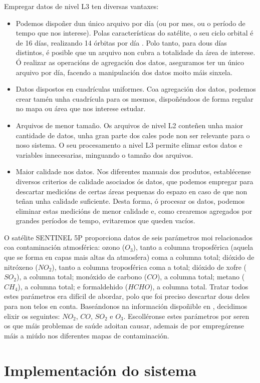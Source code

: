 Empregar datos de nivel L3 ten diversas vantaxes:
\begin{itemize}
    \item Podemos dispoñer dun único arquivo por día (ou por mes, ou o período de tempo que nos interese). Polas características do satélite, o seu ciclo orbital é de 16 días, realizando 14 órbitas
    por día \cite{s5porbit}. Polo tanto, para dous días distintos, é posible que un arquivo non cubra a totalidade da área de interese. Ó realizar as operacións de agregación dos datos, aseguramos
    ter un único arquivo por día, facendo a manipulación dos datos moito máis sinxela.
    \item Datos dispostos en cuadrículas uniformes. Coa agregación dos datos, podemos crear tamén unha cuadrícula para os mesmos, dispoñéndoos de forma regular no mapa ou área que nos interese
    estudar.
    \item Arquivos de menor tamaño. Os arquivos de nivel L2 conteñen unha maior cantidade de datos, unha gran parte dos cales pode non ser relevante para o noso sistema. O seu procesamento a nivel
    L3 permite elimar estos datos e variables innecesarias, minguando o tamaño dos arquivos.
    \item Maior calidade nos datos. Nos diferentes manuais dos produtos, establécense diversos criterios de calidade asociados ós datos, que podemos empregar para descartar medicións de certas
    áreas pequenas do espazo en caso de que non teñan unha calidade suficiente. Desta forma, ó procesar os datos, podemos eliminar estas medicións de menor calidade e, como crearemos agregados por
    grandes períodos de tempo, evitaremos que queden vacíos.
\end{itemize}

O satélite SENTINEL 5P proporciona datos de seis parámetros moi relacionados coa contaminación atmosférica: ozono ($O_3$), tanto a columna troposférica (aquela que se forma en capas mais altas da
atmosfera) coma a columna total; dióxido de nitróxeno ($NO_2$), tanto a columna troposférica coma a total; dióxido de xofre ($SO_2$), a columna total; monóxido de carbono ($CO$), a columna total;
metano ($CH_4$), a columna total; e formaldehido ($HCHO$), a columna total. Tratar todos estes parámetros era difícil de abordar, polo que foi preciso descartar dous deles para non telos en conta.
Baseándonos na información dispoñible en \cite{airpollutants}, decidimos elixir os seguintes: $NO_2$, $CO$, $SO_2$ e $O_3$. Escolléronse estes parámetros por seren os que máis problemas de saúde
adoitan causar, ademais de por empregárense máis a miúdo nos diferentes mapas de contaminación.



\section{Implementación do sistema}\label{implementacion}